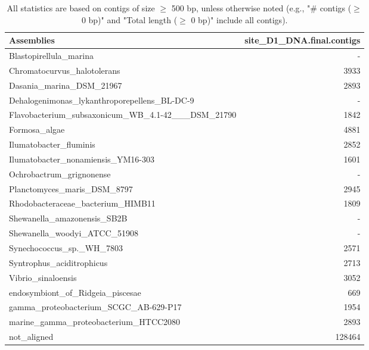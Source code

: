 \documentclass[12pt,a4paper]{article}
\begin{document}
\begin{table}[ht]
\begin{center}
\caption{All statistics are based on contigs of size $\geq$ 500 bp, unless otherwise noted (e.g., "\# contigs ($\geq$ 0 bp)" and "Total length ($\geq$ 0 bp)" include all contigs).}
\begin{tabular}{|l*{1}{|r}|}
\hline
Assemblies & site\_D1\_DNA.final.contigs \\ \hline
Blastopirellula\_marina & - \\ \hline
Chromatocurvus\_halotolerans & 3933 \\ \hline
Dasania\_marina\_DSM\_21967 & 2893 \\ \hline
Dehalogenimonas\_lykanthroporepellens\_BL-DC-9 & - \\ \hline
Flavobacterium\_subsaxonicum\_WB\_4.1-42\_\_\_DSM\_21790 & 1842 \\ \hline
Formosa\_algae & 4881 \\ \hline
Ilumatobacter\_fluminis & 2852 \\ \hline
Ilumatobacter\_nonamiensis\_YM16-303 & 1601 \\ \hline
Ochrobactrum\_grignonense & - \\ \hline
Planctomyces\_maris\_DSM\_8797 & 2945 \\ \hline
Rhodobacteraceae\_bacterium\_HIMB11 & 1809 \\ \hline
Shewanella\_amazonensis\_SB2B & - \\ \hline
Shewanella\_woodyi\_ATCC\_51908 & - \\ \hline
Synechococcus\_sp.\_WH\_7803 & 2571 \\ \hline
Syntrophus\_aciditrophicus & 2713 \\ \hline
Vibrio\_sinaloensis & 3052 \\ \hline
endosymbiont\_of\_Ridgeia\_piscesae & 669 \\ \hline
gamma\_proteobacterium\_SCGC\_AB-629-P17 & 1954 \\ \hline
marine\_gamma\_proteobacterium\_HTCC2080 & 2893 \\ \hline
not\_aligned & 128464 \\ \hline
\end{tabular}
\end{center}
\end{table}
\end{document}
